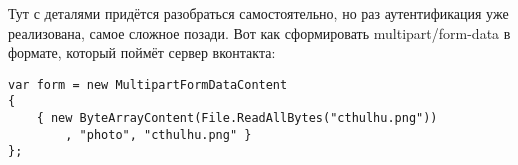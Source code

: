 \documentclass[a5paper]{article}
\begin{document}
Тут с деталями придётся разобраться самостоятельно, но раз аутентификация уже реализована, самое сложное позади. Вот как сформировать multipart/form-data в формате, который поймёт сервер вконтакта:

\begin{verbatim}
var form = new MultipartFormDataContent
{
    { new ByteArrayContent(File.ReadAllBytes("cthulhu.png"))
        , "photo", "cthulhu.png" }
};
\end{verbatim}
\end{document}
